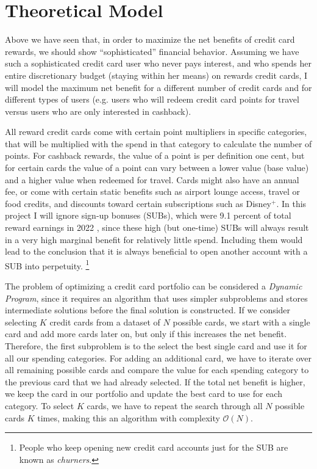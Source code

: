 \section{Theoretical Model} \label{sec:Theory}

Above we have seen that, in order to maximize the net benefits of credit card rewards, 
we should show ``sophisticated'' financial behavior.
Assuming we have such a sophisticated credit card user who never pays interest, and who spends her entire discretionary budget (staying within her means) on rewards credit cards, I will model the maximum net benefit for a different number of credit cards and for different types of users (e.g. users who will redeem credit card points for travel versus users who are only interested in cashback).

All reward credit cards come with certain point multipliers in specific categories, that will be multiplied with the spend in that category to calculate the number of points. 
For cashback rewards, the value of a point is per definition one cent, but for certain cards the value of a point can vary between a lower value (base value) and a higher value when redeemed for travel. 
Cards might also have an annual fee, or come with certain static benefits such as airport lounge access, travel or food credits, and discounts toward certain subscriptions such as Disney$^{+}$. 
In this project I will ignore sign-up bonuses (SUBs), which were 9.1 percent of total reward earnings in 2022 \citep{cfpb:2023}, since these high (but one-time) SUBs will always result in a very high marginal benefit for relatively little spend. Including them would  lead to the conclusion that it is always beneficial to open another account with a SUB into perpetuity.%
\footnote{People who keep opening new credit card accounts just for the SUB are known as \emph{churners}.}  

The problem of optimizing a credit card portfolio can be considered a \emph{Dynamic Program}, since it requires an algorithm that uses simpler subproblems and stores intermediate solutions before the final solution is constructed. 
If we consider selecting $K$ credit cards from a dataset of $N$ possible cards, we start with a single card and add more cards later on, but only if this increases the net benefit. 
Therefore, the first subproblem is to the select the best single card and use it for all our spending categories. 
For adding an additional card, we have to iterate over all remaining possible cards and compare the value for each spending category to the previous card that we had already selected. 
If the total net benefit is higher, we keep the card in our portfolio and update the best card to use for each category. 
To select $K$ cards, we have to repeat the search through all $N$ possible cards $K$ times, making this an algorithm with complexity $\mathcal{O}(N)$.
